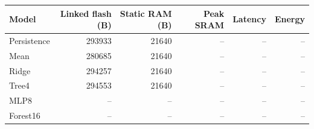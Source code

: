 \begin{tabular}{lrrrrr}
\toprule
Model & Linked flash (B) & Static RAM (B) & Peak SRAM & Latency & Energy \\
\midrule
Persistence & 293933 & 21640 & -- & -- & -- \\
Mean & 280685 & 21640 & -- & -- & -- \\
Ridge & 294257 & 21640 & -- & -- & -- \\
Tree4 & 294553 & 21640 & -- & -- & -- \\
MLP8 & -- & -- & -- & -- & -- \\
Forest16 & -- & -- & -- & -- & -- \\
\bottomrule
\end{tabular}